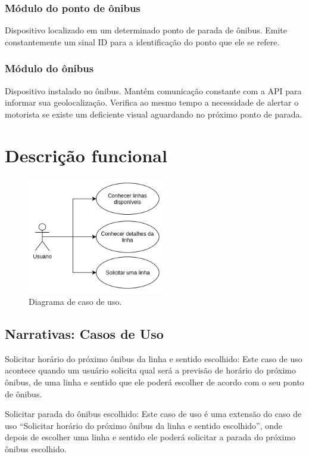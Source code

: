 \documentclass[
	12pt,				%
	oneside,			%
	a4paper,			%
	brazil				%
]{abntex2}
\begin{document}
\subsubsection{Módulo do ponto de ônibus}

Dispositivo localizado em um determinado ponto de parada de ônibus. Emite constantemente um sinal ID para a identificação do ponto que ele se refere.

\subsubsection{Módulo do ônibus}

Dispositivo instalado no ônibus. Mantém comunicação constante com a API para informar sua geolocalização. Verifica ao mesmo tempo a necessidade de alertar o motorista se existe um deficiente visual aguardando no próximo ponto de parada.

\newpage

\section{Descrição funcional}

\begin{figure}[!h]
\centering
\includegraphics[width=6cm, center]{images/use-case-diagram.png}
\caption{Diagrama de caso de uso.}
\label{Rotulo}
\end{figure}

\subsection{Narrativas: Casos de Uso}

Solicitar horário do próximo ônibus da linha e sentido escolhido: Este caso de uso acontece quando um usuário solicita qual será a previsão de horário do próximo ônibus, de uma linha e sentido que ele poderá escolher de acordo com o seu ponto de ônibus.

Solicitar parada do ônibus escolhido: Este caso de uso é uma extensão do caso de uso “Solicitar horário do próximo ônibus da linha e sentido escolhido”, onde depois de escolher uma linha e sentido ele poderá solicitar a parada do próximo ônibus escolhido.
\end{document}
